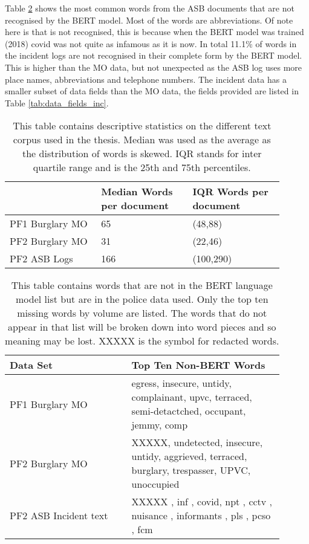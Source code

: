 Table \ref{tab:non_bert_words} shows the most common words from the ASB documents that are not recognised by the BERT model. Most of the words are abbreviations. Of note here is that  is not recognised, this is because when the BERT model was trained (2018) covid was not quite as infamous as it is now. In total 11.1\% of words in the incident logs are not recognised in their complete form by the BERT model. This is higher than the MO data, but not unexpected as the ASB log uses more place names, abbreviations and telephone numbers. The incident data has a smaller subset of data fields than the MO data, the fields provided are listed in Table \ref{tab:data_fields_inc}.

\begin{table}[]
\centering
\begin{tabular}{p{0.3\linewidth}p{0.3\linewidth}p{0.3\linewidth}} 
\toprule
                         & Median Words per document & IQR  Words per document \\\midrule
PF1 Burglary MO    &          65                 &           (48,88)                                               \\
PF2 Burglary MO &          31                 &    (22,46)                                         \\
PF2 ASB Logs      &           166                &         (100,290)                              \\  \bottomrule
\end{tabular}
\caption[Text data descriptive statistics]{\label{tab:corpus_stats} This table contains descriptive statistics on the different text corpus used in the thesis. Median was used as the average as the distribution of words is skewed. IQR stands for inter quartile range and is the 25th and 75th percentiles. }
\end{table}

\begin{table}[]
\centering
\begin{tabular}{p{0.4\linewidth}p{0.5\linewidth}}
\toprule
Data Set& Top Ten Non-BERT Words                                       \\ \midrule
PF1 Burglary MO       &  egress, insecure, untidy, complainant, upvc, terraced, semi-detactched, occupant, jemmy, comp  \\
PF2 Burglary MO       & XXXXX, undetected, insecure, untidy, aggrieved, terraced, burglary, trespasser, UPVC, unoccupied \\
PF2 ASB Incident text &  XXXXX , inf , covid, npt , cctv , nuisance , informants , pls , pcso , fcm       \\ \bottomrule
\end{tabular}
\caption[Non-Bert words PF1 and PF2 data]{\label{tab:non_bert_words} This table contains words that are not in the BERT language model list but are in the police data used. Only the top ten missing words by volume are listed. The words that do not appear in that list will be broken down into word pieces and so meaning may be lost. XXXXX is the symbol for redacted words.}
\end{table}
